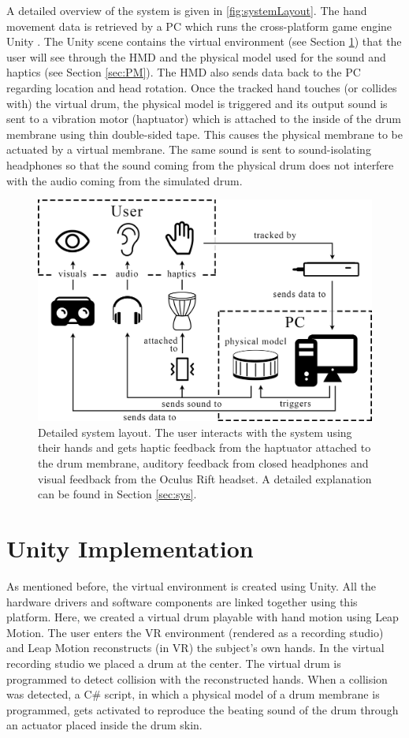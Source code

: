 \documentclass{article}
\begin{document}
A detailed overview of the system is given in \autoref{fig:systemLayout}. The hand movement data is retrieved by a PC which runs the cross-platform game engine Unity \cite{unity}. The Unity scene contains the virtual environment (see Section \ref{sec:unity}) that the user will see through the HMD and the physical model used for the sound and haptics (see Section \ref{sec:PM}). The HMD also sends data back to the PC regarding location and head rotation. Once the tracked hand touches (or collides with) the virtual drum, the physical model is triggered and its output sound is sent to a vibration motor (haptuator) which is attached to the inside of the drum membrane using thin double-sided tape. This causes the physical membrane to be actuated by a virtual membrane. The same sound is sent to sound-isolating headphones so that the sound coming from the physical drum does not interfere with the audio coming from the simulated drum.
\begin{figure}[h]
\includegraphics[width=1.0\columnwidth]{Images/systemlayout-updated.png}
\caption{Detailed system layout. The user interacts with the system using their hands and gets haptic feedback from the haptuator attached to the drum membrane, auditory feedback from closed headphones and visual feedback from the Oculus Rift headset. A detailed explanation can be found in Section \ref{sec:sys}.}
\centering
\label{fig:systemLayout}
\end{figure}
\section{Unity Implementation}\label{sec:unity}
As mentioned before, the virtual environment is  created using Unity. All the hardware drivers and software components are linked together using this platform. Here, we created a virtual drum playable with hand motion using Leap Motion. The user enters the VR environment (rendered as a recording studio) and Leap Motion reconstructs (in VR) the subject's own hands. In the virtual recording studio we placed a drum at the center. The virtual drum is programmed to detect collision with the reconstructed hands. When a collision was detected, a C\# script, in which a physical model of a drum membrane is programmed, gets activated to reproduce the beating sound of the drum through an actuator placed inside the drum skin.
\end{document}
